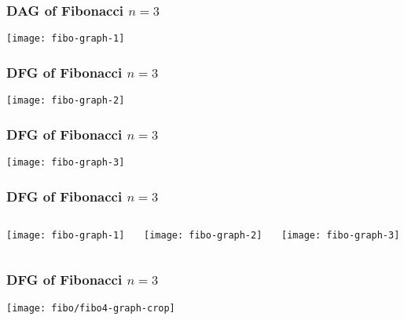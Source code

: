 \begin{frame}
  \frametitle{DAG of Fibonacci $n = 3$}
  \vspace{-12mm}
  \begin{center}
    \texttt{[image: fibo-graph-1]}
  \end{center}
\end{frame}
\begin{frame}
  \frametitle{DFG of Fibonacci $n = 3$}
  \vspace{-12mm}
  \begin{center}
    \texttt{[image: fibo-graph-2]}
  \end{center}
\end{frame}
\begin{frame}
  \frametitle{DFG of Fibonacci $n = 3$}
  \vspace{-10mm}
  \begin{center}
    \texttt{[image: fibo-graph-3]}
  \end{center}
\end{frame}
\begin{frame}
  \frametitle{DFG of Fibonacci $n = 3$}
  \vspace{-8mm}
  \begin{columns}
    \begin{column}{0.2\textwidth}
      \hspace*{-10mm}
      \texttt{[image: fibo-graph-1]}
    \end{column}
    \begin{column}{0.4\textwidth}
      \hspace*{-10mm}
      \texttt{[image: fibo-graph-2]}
    \end{column}
    \begin{column}{0.4\textwidth}
      \hspace*{-10mm}
      \texttt{[image: fibo-graph-3]}
    \end{column}
  \end{columns}
\end{frame}
\begin{frame}
  \frametitle{DFG of Fibonacci $n = 3$}
  \vspace{-10mm}
  \begin{center}
    \texttt{[image: fibo/fibo4-graph-crop]}
  \end{center}
\end{frame}
